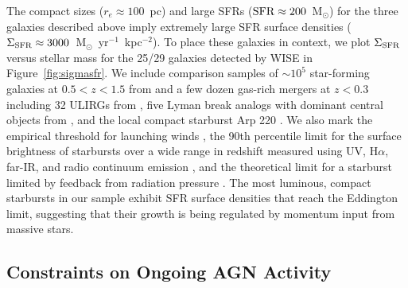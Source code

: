 \documentclass[12pt,preprint]{aastex}
\newcommand{\msun}{M$_{\odot}$}
\newcommand{\units}{M$_{\odot}$~yr$^{-1}$~kpc$^{-2}$}
\newcommand{\sigmasfr}{\Sigma_{\textnormal{\scriptsize{SFR}}}}
\begin{document}
The compact sizes ($r_e\approx100$~pc) and large SFRs
($\textnormal{SFR}\approx200$~\msun) for the three galaxies described
above imply extremely large SFR surface densities
($\sigmasfr\approx3000$~\units).  To place these galaxies in context,
we plot $\sigmasfr$ versus stellar mass for the 25/29 galaxies
detected by WISE in Figure~\ref{fig:sigmasfr}.  We include comparison
samples of $\sim10^5$ star-forming galaxies at $0.5<z<1.5$ from
\citet{wuy11} and a few dozen gas-rich mergers at $z<0.3$ including 32
ULIRGs from \citet{vei06}, five Lyman break analogs with dominant
central objects from \citet{ove09}, and the local compact starburst
Arp 220 \citep{sco97, ken98, rod08}.  We also mark the empirical
threshold for launching winds
\citep[$\sigmasfr\approx0.1$~\units,][]{hec02}, the 90th percentile
limit for the surface brightness of starbursts over a wide range in
redshift measured using UV, H$\alpha$, far-IR, and radio continuum
emission \citep[$\sigmasfr\approx25$~\units\ for a Chabrier
  IMF,][]{meu97}, and the theoretical limit for a starburst limited by
feedback from radiation pressure
\citep[$\sigmasfr\approx3000$~\units,][]{mur05,tho05,hop10}.  The most
luminous, compact starbursts in our sample exhibit SFR surface
densities that reach the Eddington limit, suggesting that their growth
is being regulated by momentum input from massive stars.


\subsection{Constraints on Ongoing AGN Activity}
\end{document}
